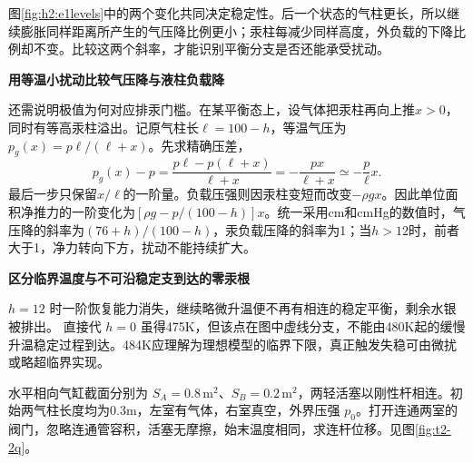 \begin{solution}
{\begin{tikzpicture}
\end{tikzpicture}}
图\ref{fig:h2:e1levels}中的两个变化共同决定稳定性。后一个状态的气柱更长，所以继续膨胀同样距离所产生的气压降比例更小；汞柱每减少同样高度，外负载的下降比例却不变。比较这两个斜率，才能识别平衡分支是否还能承受扰动。




\par\medskip{}\noindent\textbf{用等温小扰动比较气压降与液柱负载降}\par\nobreak
还需说明极值为何对应排汞门槛。在某平衡态上，设气体把汞柱再向上推$x>0$，同时有等高汞柱溢出。记原气柱长$\ell=100-h$，等温气压为$p_g(x)=p\ell/(\ell+x)$。先求精确压差，
\[
p_g(x)-p=\frac{p\ell-p(\ell+x)}{\ell+x}
=-\frac{px}{\ell+x}
\simeq-\frac p\ell x.
\]
最后一步只保留$x/\ell$的一阶量。负载压强则因汞柱变短而改变$-\rho gx$。因此单位面积净推力的一阶变化为$[\rho g-p/(100-h)]x$。统一采用cm和cmHg的数值时，气压降的斜率为$(76+h)/(100-h)$，汞负载压降的斜率为1；当$h>12$时，前者大于1，净力转向下方，扰动不能持续扩大。



\par\medskip{}\noindent\textbf{区分临界温度与不可沿稳定支到达的零汞根}\par\nobreak
$h=12$ 时一阶恢复能力消失，继续略微升温便不再有相连的稳定平衡，剩余水银被排出。
直接代 $h=0$ 虽得475K，但该点在图中虚线分支，不能由480K起的缓慢升温稳定过程到达。484K应理解为理想模型的临界下限，真正触发失稳可由微扰或略超临界实现。
\end{solution}
\par\medskip\noindent\begin{minipage}{\textwidth}
\begin{example}[连杆双缸的等温平衡]\label{t2-2}
水平相向气缸截面分别为 $S_A=0.8\,\mathrm{m^2}$、$S_B=0.2\,\mathrm{m^2}$，两轻活塞以刚性杆相连。初始两气柱长度均为0.3m，左室有气体，右室真空，外界压强 $p_0$。打开连通两室的阀门，忽略连通管容积，活塞无摩擦，始末温度相同，求连杆位移。见图\ref{fig:t2-2q}。
\end{example}
\end{minipage}
